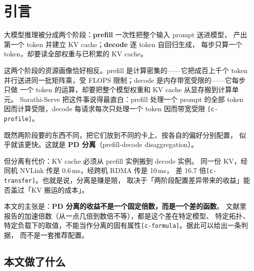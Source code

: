 \section{引言}

大模型推理被分成两个阶段：\textbf{prefill} 一次性把整个输入 prompt 送进模型，
产出第一个 token 并建立 KV cache；\textbf{decode} 逐 token 自回归生成，
每步只算一个 token，却要读全部权重与已积累的 KV cache。

这两个阶段的资源画像恰好相反。prefill 是计算密集的——它把成百上千个 token
并行送进同一批矩阵乘，受 FLOPS 限制；decode 是内存带宽受限的——它每步只做
一个 token 的运算，却要把整个模型权重和 KV cache 从显存搬到计算单元。
Sarathi-Serve 把这件事说得最直白：prefill 处理一个 prompt 的全部 token
因而计算受限，decode 每请求每次只处理一个 token 因而带宽受限
\texttt{[c-profile]}。

既然两阶段要的东西不同，把它们放到不同的卡上、按各自的偏好分别配置，
似乎就该更快。这就是 \textbf{PD 分离}（prefill-decode disaggregation）。

但分离有代价：KV cache 必须从 prefill 实例搬到 decode 实例。
同一份 KV，经同机 NVLink 传是 0.6\,ms，经跨机 RDMA 传是 10\,ms，
差 16.7 倍\texttt{[c-transfer]}。也就是说，分离是赚是赔，
取决于「两阶段配置差异带来的收益」能否盖过「KV 搬运的成本」。

本文的主张是：\textbf{PD 分离的收益不是一个固定倍数，而是一个差的函数}。
文献里报告的加速倍数（从一点几倍到数倍不等），都是这个差在特定模型、
特定拓扑、特定负载下的取值，不能当作分离的固有属性\texttt{[c-formula]}。据此可以给出一条判据，
而不是一套推荐配置。

\subsection{本文做了什么}


